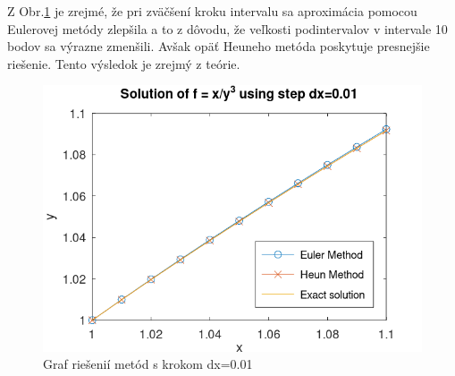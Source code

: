 \documentclass{article}
\theoremstyle{definition}
\theoremstyle{remark}
\begin{document}
Z Obr.\ref{fig:dx001} je zrejmé, že pri zväčšení kroku intervalu sa aproximácia pomocou Eulerovej metódy zlepšila a to z dôvodu, že veľkosti podintervalov v intervale 10 bodov sa výrazne zmenšili. Avšak opäť Heuneho metóda poskytuje presnejšie riešenie. Tento výsledok je zrejmý z teórie.
\begin{figure}
  \centering
  \includegraphics[width=1\textwidth]{dx001.png}
  \caption{Graf riešenií metód s krokom dx=0.01}
  \label{fig:dx001}
\end{figure}
\end{document}
